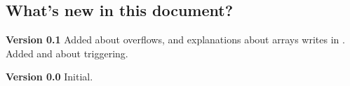 \subsection{What's new in this document?}

\noindent \textbf{Version 0.1}
Added  about overflows, and explanations about arrays writes in .
Added  and  about triggering.

\noindent \textbf{Version 0.0}
Initial.

% 
%
